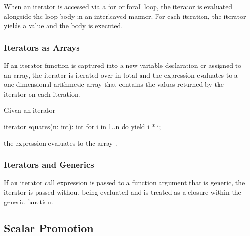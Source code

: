 When an iterator is accessed via a for or forall loop, the iterator is
evaluated alongside the loop body in an interleaved manner.  For each
iteration, the iterator yields a value and the body is executed.

\subsubsection{Iterators as Arrays}
\label{Iterators_as_Arrays}

If an iterator function is captured into a new variable declaration or
assigned to an array, the iterator is iterated over in total and the
expression evaluates to a one-dimensional arithmetic array that
contains the values returned by the iterator on each iteration.
\begin{example}
Given an iterator
\begin{chapel}
iterator squares(n: int): int {
  for i in 1..n do
    yield i * i;
}
\end{chapel}
the expression  evaluates to the array .
\end{example}

\subsubsection{Iterators and Generics}
\label{Iterators_and_Generics}

If an iterator call expression is passed to a function argument that
is generic, the iterator is passed without being evaluated and is
treated as a closure within the generic function.

\subsection{Scalar Promotion}
\label{Scalar_Promotion}

